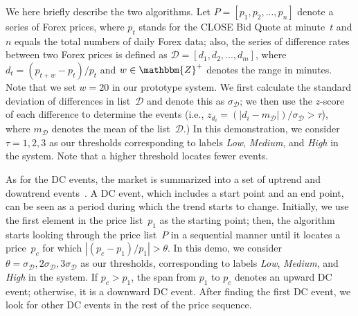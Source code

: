 \documentclass[runningheads]{llncs}
\begin{document}
We here briefly describe the two algorithms.
Let $P= [p_1, p_2, ..., p_n]$ denote a series of Forex prices, where $p_t$
stands for the CLOSE Bid Quote at minute~$t$ and $n$ equals the total
numbers of daily Forex data; also, the series of difference rates between two
Forex prices is defined as $\mathcal{D}= [d_1, d_2, ..., d_m]$, where $d_t =
{(p_{t+w}-p_t)}/{p_t}$ and $w\in\mathbbm{Z}^+$ denotes the range in minutes.
Note that we set $w=20$ in our prototype system.
We first calculate the standard deviation of differences in list~$\mathcal{D}$
and denote this as $\sigma_\mathcal{D}$; we then use the $z$-score of each
difference to determine the events (i.e.,
$z_{d_i}=(|d_i-m_{\mathcal{D}}|)/\sigma_{\mathcal{D}}>\tau$), where
$m_{\mathcal{D}}$ denotes the mean of the list~$\mathcal{D}$.)
In this demonstration, we consider $\tau=1,2,3$ as our thresholds 
corresponding to labels \emph{Low}, \emph{Medium}, and \emph{High} in the
system. 
Note that a higher threshold locates fewer events.

As for the DC events, the market is summarized into a set of uptrend and
downtrend events~\cite{7850020}.
A DC event, which includes a start point and an end point, can be seen as a period
during which the trend starts to change.
Initially, we use the first element in the price list~$p_1$ as the starting point; then, the algorithm starts looking through the price list~$P$
in a sequential manner until it locates a price~$p_c$ for which
$|{(p_c-p_1)}/{p_1}|>\theta$.
In this demo, we consider
$\theta=\sigma_{\mathcal{D}},2\sigma_{\mathcal{D}},3\sigma_{\mathcal{D}}$ as
our thresholds, corresponding to labels \emph{Low},
\emph{Medium}, and \emph{High} in the system.
If $p_c > p_1$, the span from $p_1$ to $p_c$ denotes an upward DC event;
otherwise, it is a downward DC event.
After finding the first DC event, we look for other DC events in the
rest of the price sequence.
\vspace{-0.5cm}
\end{document}
